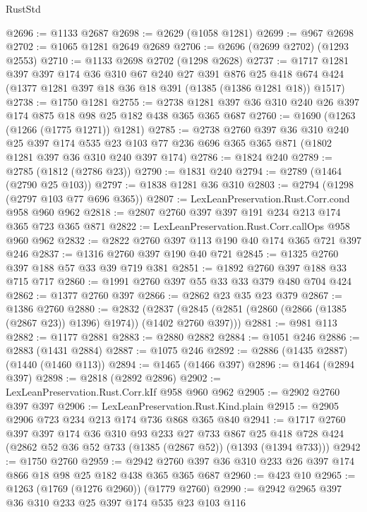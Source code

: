 \begin{lexlean}{RustStd}
\begin{coremodule}
@2696 := @1133 @2687
@2698 := @2629 (@1058 @1281)
@2699 := @967 @2698
@2702 := @1065 @1281 @2649 @2689
@2706 := @2696 (@2699 @2702) (@1293 @2553)
@2710 := @1133 @2698 @2702 (@1298 @2628)
@2737 := @1717
    @1281
    @397
    @397
    @174
    @36
    @310
    @67
    @240
    @27
    @391
    @876
    @25
    @418
    @674
    @424
    (@1377 @1281 @397 @18 @36 @18 @391 (@1385 (@1386 @1281 @18)) @1517)
@2738 := @1750 @1281
@2755 := @2738 @1281 @397 @36 @310 @240 @26 @397 @174 @875 @18 @98 @25 @182 @438 @365 @365 @687
@2760 := @1690 (@1263 (@1266 (@1775 @1271)) @1281)
@2785 := @2738
    @2760
    @397
    @36
    @310
    @240
    @25
    @397
    @174
    @535
    @23
    @103
    @77
    @236
    @696
    @365
    @365
    @871
    (@1802 @1281 @397 @36 @310 @240 @397 @174)
@2786 := @1824 @240
@2789 := @2785 (@1812 (@2786 @23))
@2790 := @1831 @240
@2794 := @2789 (@1464 (@2790 @25 @103))
@2797 := @1838 @1281 @36 @310
@2803 := @2794 (@1298 (@2797 @103 @77 @696 @365))
@2807 := LexLeanPreservation.Rust.Corr.cond @958 @960 @962
@2818 := @2807 @2760 @397 @397 @191 @234 @213 @174 @365 @723 @365 @871
@2822 := LexLeanPreservation.Rust.Corr.callOps @958 @960 @962
@2832 := @2822 @2760 @397 @113 @190 @40 @174 @365 @721 @397 @246
@2837 := @1316 @2760 @397 @190 @40 @721
@2845 := @1325 @2760 @397 @188 @57 @33 @39 @719 @381
@2851 := @1892 @2760 @397 @188 @33 @715 @717
@2860 := @1991 @2760 @397 @55 @33 @33 @379 @480 @704 @424
@2862 := @1377 @2760 @397
@2866 := @2862 @23 @35 @23 @379
@2867 := @1386 @2760
@2880 := @2832
    (@2837 (@2845 (@2851 (@2860 (@2866 (@1385 (@2867 @23)) @1396) @1974)) (@1402 @2760 @397)))
@2881 := @981 @113
@2882 := @1177 @2881
@2883 := @2880 @2882
@2884 := @1051 @246
@2886 := @2883 (@1431 @2884)
@2887 := @1075 @246
@2892 := @2886 (@1435 @2887) (@1440 (@1460 @113))
@2894 := @1465 (@1466 @397)
@2896 := @1464 (@2894 @397)
@2898 := @2818 (@2892 @2896)
@2902 := LexLeanPreservation.Rust.Corr.kIf @958 @960 @962
@2905 := @2902 @2760 @397 @397
@2906 := LexLeanPreservation.Rust.Kind.plain
@2915 := @2905 @2906 @723 @234 @213 @174 @736 @868 @365 @840
@2941 := @1717
    @2760
    @397
    @397
    @174
    @36
    @310
    @93
    @233
    @27
    @733
    @867
    @25
    @418
    @728
    @424
    (@2862 @52 @36 @52 @733 (@1385 (@2867 @52)) (@1393 (@1394 @733)))
@2942 := @1750 @2760
@2959 := @2942 @2760 @397 @36 @310 @233 @26 @397 @174 @866 @18 @98 @25 @182 @438 @365 @365 @687
@2960 := @423 @10
@2965 := @1263 (@1769 (@1276 @2960)) (@1779 @2760)
@2990 := @2942
    @2965
    @397
    @36
    @310
    @233
    @25
    @397
    @174
    @535
    @23
    @103
    @116

\end{coremodule}
\end{lexlean}
